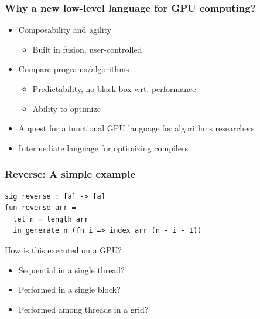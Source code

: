 \documentclass{beamer}
\begin{document}
\begin{frame}
\frametitle{Why a new low-level language for GPU computing?}
\begin{itemize}
\item Composability and agility
  \begin{itemize}
  \item Built in fusion, user-controlled
  \end{itemize}

\item Compare programs/algorithms
  \begin{itemize}
  \item Predictability, no black box wrt. performance
  \item Ability to optimize
  \end{itemize}
\item A quest for a functional GPU language for algorithms researchers
\item Intermediate language for optimizing compilers
\end{itemize}
\end{frame}

\begin{frame}[fragile]
\frametitle{Reverse: A simple example}

\begin{verbatim}
sig reverse : [a] -> [a]
fun reverse arr =
  let n = length arr
  in generate n (fn i => index arr (n - i - 1))
\end{verbatim}



\pause

How is this executed on a GPU?
\begin{itemize}
\item Sequential in a single thread?
\item Performed in a single block?
\item Performed among threads in a grid?
\end{itemize}

\end{frame}
\end{document}
